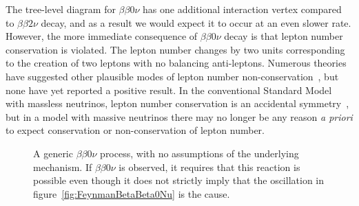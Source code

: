 The tree-level diagram for $\beta\beta 0\nu$ has one additional interaction vertex compared to $\beta\beta 2\nu$ decay, and as a result we would expect it to occur at an even slower rate.  However, the more immediate consequence of $\beta\beta 0\nu$ decay is that lepton number conservation is violated.  The lepton number changes by two units corresponding to the creation of two leptons with no balancing anti-leptons.  Numerous theories have suggested other plausible modes of lepton number non-conservation~\cite{ProtonDecay,MuonToPositron}, but none have yet reported a positive result.  In the conventional Standard Model with massless neutrinos, lepton number conservation is an accidental symmetry~\cite{LeptonConservation}, but in a model with massive neutrinos there may no longer be any reason \textit{a priori} to expect conservation or non-conservation of lepton number.

\begin{figure}
\begin{center}
\end{center}
\caption{A generic $\beta\beta 0\nu$ process, with no assumptions of the underlying mechanism.  If $\beta\beta 0\nu$ is observed, it requires that this reaction is possible even though it does not strictly imply that the oscillation in figure~\ref{fig:FeynmanBetaBeta0Nu} is the cause.}
\label{fig:FeynmanBetaBeta0NuBlob}
\end{figure}

